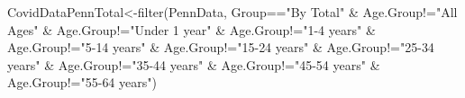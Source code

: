 \documentclass[
]{article}
\newenvironment{Shaded}{\begin{snugshade}}{\end{snugshade}}
\newcommand{\FunctionTok}[1]{\textcolor[rgb]{0.00,0.00,0.00}{#1}}
\newcommand{\NormalTok}[1]{#1}
\newcommand{\OtherTok}[1]{\textcolor[rgb]{0.56,0.35,0.01}{#1}}
\newcommand{\SpecialCharTok}[1]{\textcolor[rgb]{0.00,0.00,0.00}{#1}}
\newcommand{\StringTok}[1]{\textcolor[rgb]{0.31,0.60,0.02}{#1}}
\begin{document}
\begin{Shaded}
\begin{Highlighting}[]
\NormalTok{CovidDataPennTotal}\OtherTok{\textless{}{-}}\FunctionTok{filter}\NormalTok{(PennData, Group}\SpecialCharTok{==}\StringTok{"By Total"} \SpecialCharTok{\&}\NormalTok{ Age.Group}\SpecialCharTok{!=}\StringTok{"All Ages"} \SpecialCharTok{\&}\NormalTok{ Age.Group}\SpecialCharTok{!=}\StringTok{"Under 1 year"} \SpecialCharTok{\&}\NormalTok{ Age.Group}\SpecialCharTok{!=}\StringTok{"1{-}4 years"} \SpecialCharTok{\&}\NormalTok{ Age.Group}\SpecialCharTok{!=}\StringTok{"5{-}14 years"} \SpecialCharTok{\&}\NormalTok{ Age.Group}\SpecialCharTok{!=}\StringTok{"15{-}24 years"} \SpecialCharTok{\&}\NormalTok{ Age.Group}\SpecialCharTok{!=}\StringTok{"25{-}34 years"} \SpecialCharTok{\&}\NormalTok{ Age.Group}\SpecialCharTok{!=}\StringTok{"35{-}44 years"} \SpecialCharTok{\&}\NormalTok{ Age.Group}\SpecialCharTok{!=}\StringTok{"45{-}54 years"} \SpecialCharTok{\&}\NormalTok{ Age.Group}\SpecialCharTok{!=}\StringTok{"55{-}64 years"}\NormalTok{)}
\end{Highlighting}
\end{Shaded}
\end{document}

